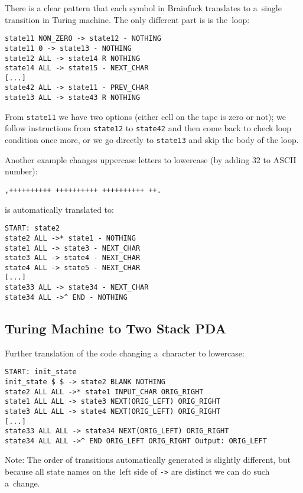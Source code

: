 \documentclass[english,shortabstract,mgr]{iithesis}
\begin{document}
There is a clear pattern that each symbol in Brainfuck translates
to a~single transition in Turing machine. The only different part is
is the~loop:
\begin{verbatim}
state11 NON_ZERO -> state12 - NOTHING
state11 0 -> state13 - NOTHING
state12 ALL -> state14 R NOTHING
state14 ALL -> state15 - NEXT_CHAR
[...]
state42 ALL -> state11 - PREV_CHAR
state13 ALL -> state43 R NOTHING
\end{verbatim}

From \texttt{state11} we have two options (either cell on the tape is zero
or not); we follow instructions from \texttt{state12} to \texttt{state42}
and then come back to check loop condition once more, or we go directly
to \texttt{state13} and skip the body of the loop.

Another example changes uppercase letters to lowercase (by adding $32$
to ASCII number):

\begin{verbatim}
,++++++++++ ++++++++++ ++++++++++ ++.
\end{verbatim}
%
is automatically translated to:

\begin{verbatim}
START: state2
state2 ALL ->* state1 - NOTHING
state1 ALL -> state3 - NEXT_CHAR
state3 ALL -> state4 - NEXT_CHAR
state4 ALL -> state5 - NEXT_CHAR
[...]
state33 ALL -> state34 - NEXT_CHAR
state34 ALL ->^ END - NOTHING
\end{verbatim}

\subsection{Turing Machine to Two Stack PDA}

Further translation of the code changing a~character to lowercase:

\begin{verbatim}
START: init_state
init_state $ $ -> state2 BLANK NOTHING
state2 ALL ALL ->* state1 INPUT_CHAR ORIG_RIGHT
state1 ALL ALL -> state3 NEXT(ORIG_LEFT) ORIG_RIGHT
state3 ALL ALL -> state4 NEXT(ORIG_LEFT) ORIG_RIGHT
[...]
state33 ALL ALL -> state34 NEXT(ORIG_LEFT) ORIG_RIGHT
state34 ALL ALL ->^ END ORIG_LEFT ORIG_RIGHT Output: ORIG_LEFT
\end{verbatim}

Note: The order of transitions automatically generated is slightly different,
but because all state names on the~left side of \texttt{->} are distinct
we can do such a~change.
\end{document}
